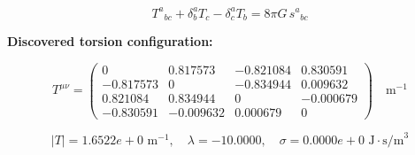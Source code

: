 
\begin{equation}
  T^a{}_{bc} + \delta^a_b T_c - \delta^a_c T_b = 8\pi G \, s^a{}_{bc}
\end{equation}

\textbf{Discovered torsion configuration:}

\begin{equation}
  T^{\mu\nu} = \begin{pmatrix}
    0 & 0.817573 & -0.821084 & 0.830591 \\
    -0.817573 & 0 & -0.834944 & 0.009632 \\
    0.821084 & 0.834944 & 0 & -0.000679 \\
    -0.830591 & -0.009632 & 0.000679 & 0
  \end{pmatrix} \quad \text{m}^{-1}
\end{equation}

\begin{equation}
  |T| = 1.6522e+0 \text{ m}^{-1}, \quad
  \lambda = -10.0000, \quad
  \sigma = 0.0000e+0 \text{ J}\cdot\text{s/m}^3
\end{equation}